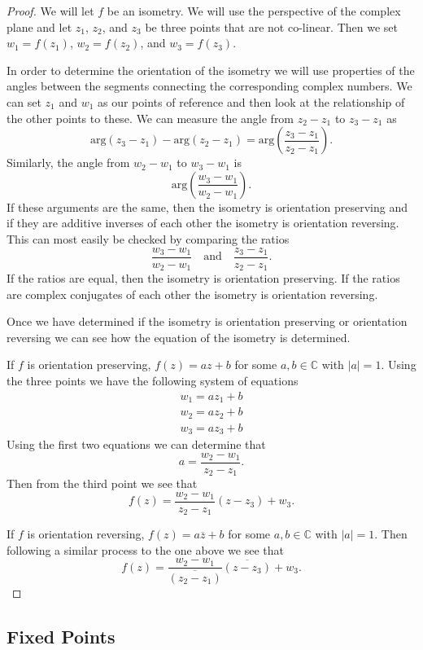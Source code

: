 \documentclass[
]{book}
\theoremstyle{definition}
\theoremstyle{definition}
\theoremstyle{definition}
\theoremstyle{definition}
\theoremstyle{remark}
\begin{document}
\begin{proof}
We will let \(f\) be an isometry. We will use the perspective of the complex plane and let \(z_1\), \(z_2\), and \(z_3\) be three points that are not co-linear. Then we set \(w_1=f(z_1)\), \(w_2=f(z_2)\), and \(w_3=f(z_3)\).

In order to determine the orientation of the isometry we will use properties of the angles between the segments connecting the corresponding complex numbers. We can set \(z_1\) and \(w_1\) as our points of reference and then look at the relationship of the other points to these. We can measure the angle from \(z_2-z_1\) to \(z_3-z_1\) as
\[\mbox{arg}(z_3-z_1)-\mbox{arg}(z_2-z_1) = \mbox{arg}\left(\frac{z_3-z_1}{z_2-z_1}\right).\]
Similarly, the angle from \(w_2-w_1\) to \(w_3-w_1\) is
\[\mbox{arg} \left( \frac{w_3-w_1}{w_2-w_1}\right).\] If these arguments are the same, then the isometry is orientation preserving and if they are additive inverses of each other the isometry is orientation reversing. This can most easily be checked by comparing the ratios
\[\frac{w_3-w_1}{w_2-w_1} \quad \mbox{and} \quad \frac{z_3-z_1}{z_2-z_1}.\] If the ratios are equal, then the isometry is orientation preserving. If the ratios are complex conjugates of each other the isometry is orientation reversing.

Once we have determined if the isometry is orientation preserving or orientation reversing we can see how the equation of the isometry is determined.

If \(f\) is orientation preserving, \(f(z)=az+b\) for some \(a,b\in \mathbb{C}\) with \(|a|=1\). Using the three points we have the following system of equations
\[\begin{matrix} w_1=a z_1 + b \\
w_2=a z_2+b \\
w_3=a z_3+b 
\end{matrix}\]
Using the first two equations we can determine that
\[a=\frac{w_2-w_1}{z_2-z_1}.\]
Then from the third point we see that \[f(z) = \frac{w_2-w_1}{z_2-z_1} (z-z_3) + w_3.\]

If \(f\) is orientation reversing, \(f(z)=a\overline{z}+b\) for some \(a,b\in \mathbb{C}\) with \(|a|=1\). Then following a similar process to the one above we see that
\[f(z)= \frac{w_2-w_1}{\overline{(z_2-z_1)}} \overline{(z-z_3)} + w_3.\]
\end{proof}

\hypertarget{fixed-points}{%
\subsection{Fixed Points}\label{fixed-points}}
\end{document}
